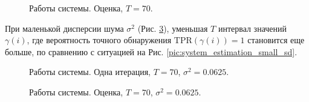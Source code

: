 \documentclass[specialist, substylefile = spbu.rtx,
			   subf, href, 12pt]{disser}
\begin{document}
\begin{figure}[!hhh]
	\caption{Работы системы. Оценка, $ T = 70 $.}
	\label{pic:system_estimation_t=70}
\end{figure}

\newpage
При маленькой дисперсии шума $ \sigma^2 $ (Рис. \ref{pic:system_estimation_t=70_small_sd}), уменьшая $ T $ интервал значений $ \gamma(i) $, где вероятность точного обнаружения $ \mathrm{TPR}(\gamma(i)) = 1 $ становится еще больше, по сравнению с ситуацией на Рис. \ref{pic:system_estimation_small_sd}.

\begin{figure}[!hhh]
	\caption{Работы системы. Одна итерация, $ T = 70 $, $ \sigma^2=0.0625 $.}
	\label{pic:system_estimation_one_iter_t=70_small_sd}
\end{figure}

\begin{figure}[!hhh]
	\caption{Работы системы. Оценка, $ T = 70 $, $ \sigma^2=0.0625 $.}
	\label{pic:system_estimation_t=70_small_sd}
\end{figure}
\end{document}
